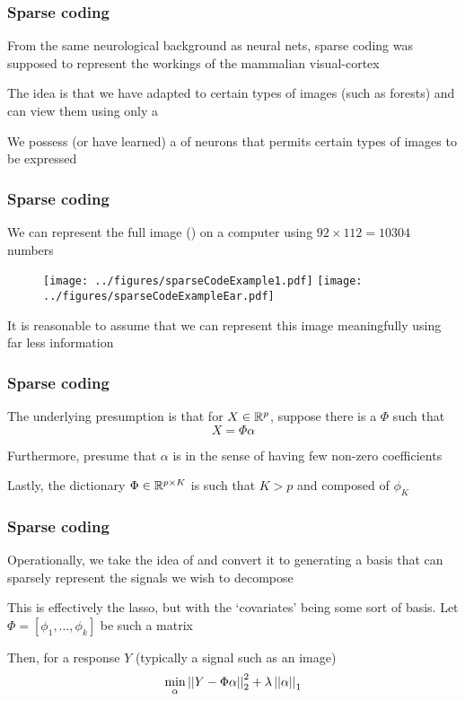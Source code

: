 \documentclass[12pt]{beamer}
\begin{document}
\begin{frame}[fragile]
\frametitle{Sparse coding}
From the same neurological background as neural nets, sparse coding was supposed
to represent the workings of the mammalian visual-cortex 


\vsp
The idea is that we have adapted to certain types of images (such as forests) and can view
them using only a 

\vsp
{} We possess (or have learned) a  of neurons that permits
certain types of images to be expressed 
\end{frame}

\begin{frame}[fragile]
\frametitle{Sparse coding}
We can represent the full image () on a computer using $92 \times 112 = 10304$ numbers

\begin{figure}
\centering
\texttt{[image: ../figures/sparseCodeExample1.pdf]}
\texttt{[image: ../figures/sparseCodeExampleEar.pdf]}
\end{figure}

It is reasonable to assume that we can represent this image meaningfully using far less information
\end{frame}

\begin{frame}[fragile]
\frametitle{Sparse coding}
The underlying presumption is that for $X \in \mathbb{R}^p$, suppose there is a  $\Phi$
such that
\[
X = \Phi\alpha
\]

\vsp
Furthermore, presume that $\alpha$ is  in the sense of having few non-zero coefficients

\vsp
Lastly, the dictionary $\Phi \in \mathbb{R}^{p \times K}$ is such that $K > p$ and composed of  $\phi_K$

\end{frame}


\begin{frame}[fragile]
\frametitle{Sparse coding}
Operationally, we take the idea of  and convert it to generating a basis that can
sparsely represent the signals we wish to decompose

\vsp
{} This is effectively the lasso, but with the `covariates' being some
sort of basis.  Let $\Phi = [\phi_1,\ldots,\phi_k]$ be such a matrix


\vsp
Then, for a response $Y$ (typically a signal such as an image)
\[
\min_{\alpha} \left|\left| Y - \Phi\alpha \right|\right|_2^2 + \lambda \left|\left| \alpha \right|\right|_1
\]
\end{frame}
\end{document}
